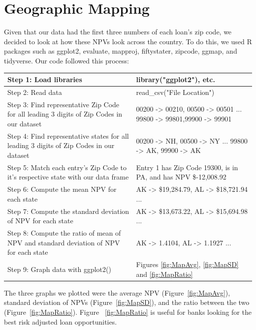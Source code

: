 \documentclass[12 pt]{uncw_thesis}
\theoremstyle{plain}
\theoremstyle{remark}
\theoremstyle{definition}
\begin{document}
\section{Geographic Mapping}
Given that our data had the first three numbers of each loan's zip code, we decided to look at how these NPVs look across the country. To do this, we used R packages such as ggplot2, evaluate, mapproj, fiftystater, zipcode, ggmap, and tidyverse. Our code followed this process:
\begin{center}
	\begin{tabular}{|M{6cm}|M{8cm}|} 
		\hline
		Step 1: Load libraries& library("ggplot2"), etc.\\
		\hline
		Step 2: Read data & read\_csv("File Location")\\
		\hline
		Step 3: Find representative Zip Code for all leading 3 digits of Zip Codes in our dataset&  00200 -> 00210,  00500 -> 00501 ... 99800 -> 99801,99900 -> 99901\\
		\hline
		Step 4: Find representative states for all leading 3 digits of Zip Codes in our dataset& 00200 -> NH, 00500 -> NY ... 99800 -> AK, 99900 -> AK\\
		\hline
		Step 5: Match each entry's Zip Code to it's respective state with our data frame& Entry 1 has Zip Code 19300, is in PA, and has NPV \$-12,008.92\\
		\hline
		Step 6: Compute the mean NPV for each state & AK -> \$19,284.79, AL -> \$18,721.94 ...\\ 
		\hline
		Step 7: Compute the standard deviation of NPV for each state & AK -> \$13,673.22, AL -> \$15,694.98 ...\\
		\hline
		Step 8: Compute the ratio of mean of NPV and standard deviation of NPV for each state & AK -> 1.4104, AL -> 1.1927 ...\\
		\hline
		Step 9: Graph data with ggplot2() & Figures \ref{fig:MapAvg}, \ref{fig:MapSD} and \ref{fig:MapRatio}\\
		\hline
	\end{tabular}
\end{center}
The three graphs we plotted were the average NPV (Figure~\ref{fig:MapAvg}), standard deviation of NPVs (Figure~\ref{fig:MapSD}), and the ratio between the two (Figure~\ref{fig:MapRatio}). Figure ~\ref{fig:MapRatio} is useful for banks looking for the best risk adjusted loan opportunities.
\end{document}
